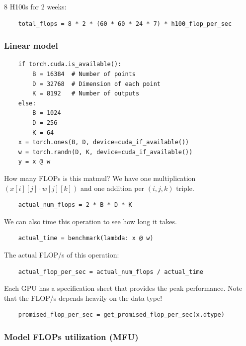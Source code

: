\documentclass[12pt,twoside]{article}
\begin{document}
8 H100s for 2 weeks:

\begin{verbatim}
    total_flops = 8 * 2 * (60 * 60 * 24 * 7) * h100_flop_per_sec
\end{verbatim}

\subsubsection*{Linear model}

\begin{verbatim}
    if torch.cuda.is_available():
        B = 16384  # Number of points
        D = 32768  # Dimension of each point
        K = 8192   # Number of outputs
    else:
        B = 1024
        D = 256
        K = 64
    x = torch.ones(B, D, device=cuda_if_available())
    w = torch.randn(D, K, device=cuda_if_available())
    y = x @ w
\end{verbatim}

How many FLOPs is this matmul? We have one multiplication \((x[i][j] \cdot w[j][k])\) and one addition per \((i, j, k)\) triple.

\begin{verbatim}
    actual_num_flops = 2 * B * D * K  
\end{verbatim}

We can also time this operation to see how long it takes.

\begin{verbatim}
    actual_time = benchmark(lambda: x @ w) 
\end{verbatim}

The actual FLOP/s of this operation:

\begin{verbatim}
    actual_flop_per_sec = actual_num_flops / actual_time
\end{verbatim}

Each GPU has a specification sheet that provides the peak performance. Note that the FLOP/s depends heavily on the data type!

\begin{verbatim}
    promised_flop_per_sec = get_promised_flop_per_sec(x.dtype)
\end{verbatim}

\subsubsection*{Model FLOPs utilization (MFU)}
\end{document}
